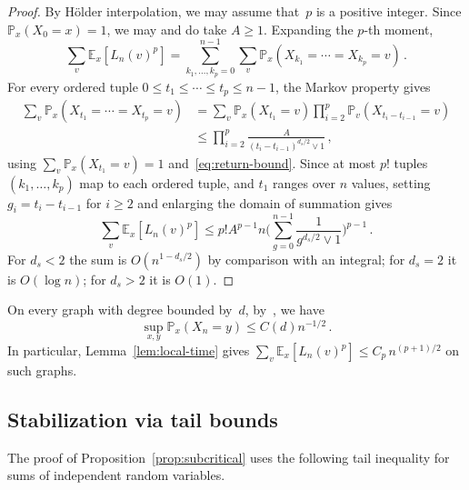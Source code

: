 \documentclass[aop]{imsart}
\theoremstyle{plain}
\theoremstyle{definition}
\newcommand{\E}{\mathbb{E}}
\renewcommand{\P}{\mathbb{P}}
\begin{document}
	\begin{proof}
		By H\"older interpolation, we may assume that~$p$ is a positive integer.
		Since $\P_x(X_0=x)=1$, we may and do take $A\geq 1$.
		Expanding the $p$-th moment,
		\[
		\sum_v \E_x[L_n(v)^p]
		= \sum_{k_1,\ldots,k_p=0}^{n-1}
		\sum_v \P_x(X_{k_1} = \cdots = X_{k_p} = v)\,.
		\]
		For every ordered tuple $0 \leq t_1 \leq \cdots \leq t_p \leq n-1$,
		the Markov property gives
		\begin{align*}
		\sum_v \P_x(X_{t_1} = \cdots = X_{t_p} = v)
		&= \sum_v \P_x(X_{t_1}=v)\prod_{i=2}^{p} \P_v(X_{t_i - t_{i-1}}=v)\\
		&\leq \prod_{i=2}^{p} \frac{A}{(t_i - t_{i-1})^{d_s/2} \vee 1}\,,
		\end{align*}
		using $\sum_v \P_x(X_{t_1}=v) = 1$ and~\eqref{eq:return-bound}.
		Since at most $p!$ tuples $(k_1,\ldots,k_p)$ map to each ordered tuple,
		and $t_1$ ranges over $n$ values, setting $g_i = t_i - t_{i-1}$
		for $i \geq 2$ and enlarging the domain of summation gives
		\[
		\sum_v \E_x[L_n(v)^p]
		\leq p! A^{p-1} n
		\biggl(\sum_{g=0}^{n-1} \frac{1}{g^{d_s/2} \vee 1}\biggr)^{p-1}\,.
		\]
		For $d_s<2$ the sum is $O(n^{1-d_s/2})$ by comparison with an integral; for $d_s=2$ it is $O(\log n)$; for $d_s>2$ it is $O(1)$.
		\qedhere
	\end{proof}
	
	On every graph with degree bounded by~$d$, by~\citet[Example~5.14]{Grigoryan},
	we have
	\begin{equation}
		\label{eq:heat-kernel-upper-bound}
		\sup_{x,y} \P_x(X_n = y) \leq C(d) n^{-1/2}\,.
	\end{equation}
	In particular, Lemma~\ref{lem:local-time} gives $\sum_v\E_x[L_n(v)^p]\leq C_p\,n^{(p+1)/2}$ on such graphs.
	
	\subsection{Stabilization via tail bounds}
	
	The proof of Proposition~\ref{prop:subcritical} uses the following tail inequality for sums of independent random variables.
	
\end{document}
